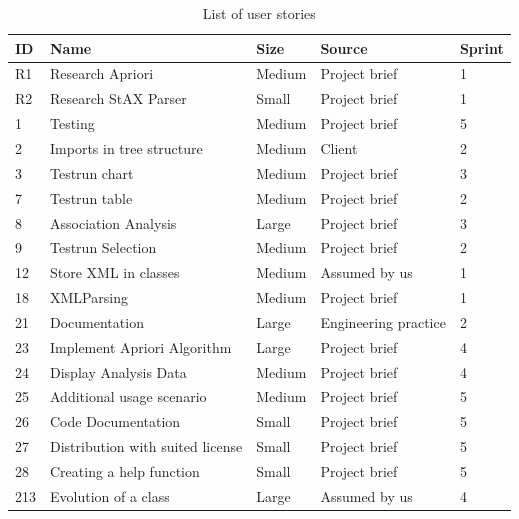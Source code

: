 
\begin{table}[!h]
  \caption{List of user stories}
  \centering
  \begin{tabular}{l||l|l|l|l|}
    ID & Name & Size &  Source & Sprint\\
    \hline
    R1&Research Apriori&Medium&Project brief&1\\
    R2&Research StAX Parser&Small&Project brief&1\\
    1&Testing&Medium&Project brief&5\\
    2&Imports in tree structure&Medium&Client&2\\ %
    3&Testrun chart&Medium&Project brief&3\\
    7&Testrun table&Medium&Project brief&2\\
    8&Association Analysis&Large&Project brief&3\\
    9&Testrun Selection&Medium&Project brief&2\\
    12&Store XML in classes&Medium&Assumed by us&1\\ 
    18&XMLParsing&Medium&Project brief&1\\
    21&Documentation&Large&Engineering practice&2\\
    23&Implement Apriori Algorithm&Large&Project brief&4\\
    24&Display Analysis Data&Medium&Project brief&4\\
    25&Additional usage scenario&Medium&Project brief&5\\
    26&Code Documentation&Small&Project brief&5\\
    27&Distribution with suited license&Small&Project brief&5\\ %
    28&Creating a help function&Small&Project brief&5\\
    213&Evolution of a class&Large&Assumed by us&4\label{evolution213}\\ 
  
	\end{tabular}
  \label{tab:user_stories}
\end{table}

